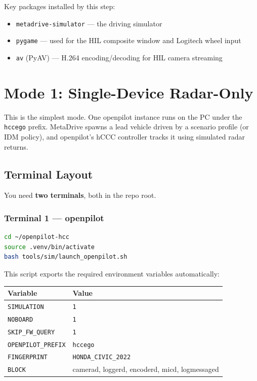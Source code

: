 \documentclass[11pt, letterpaper]{article}
\begin{document}
Key packages installed by this step:
\begin{itemize}
  \item \texttt{metadrive-simulator} --- the driving simulator
  \item \texttt{pygame} --- used for the HIL composite window and
        Logitech wheel input
  \item \texttt{av} (PyAV) --- H.264 encoding/decoding for HIL camera
        streaming
\end{itemize}


\section{Mode 1: Single-Device Radar-Only}
\label{sec:mode1}

This is the simplest mode.  One openpilot instance runs on the PC under
the \texttt{hccego} prefix.  MetaDrive spawns a lead vehicle driven by a
scenario profile (or IDM policy), and openpilot's hCCC controller tracks
it using simulated radar returns.

\subsection{Terminal Layout}

You need \textbf{two terminals}, both in the repo root.

\subsubsection{Terminal 1 --- openpilot}

\begin{lstlisting}[language=bash]
cd ~/openpilot-hcc
source .venv/bin/activate
bash tools/sim/launch_openpilot.sh
\end{lstlisting}

This script exports the required environment variables automatically:

\begin{center}
\begin{tabular}{@{}ll@{}}
\toprule
\textbf{Variable} & \textbf{Value} \\
\midrule
\texttt{SIMULATION}         & \texttt{1} \\
\texttt{NOBOARD}            & \texttt{1} \\
\texttt{SKIP\_FW\_QUERY}    & \texttt{1} \\
\texttt{OPENPILOT\_PREFIX}  & \texttt{hccego} \\
\texttt{FINGERPRINT}        & \texttt{HONDA\_CIVIC\_2022} \\
\texttt{BLOCK}              & camerad, loggerd, encoderd, micd, logmessaged \\
\bottomrule
\end{tabular}
\end{center}
\end{document}
